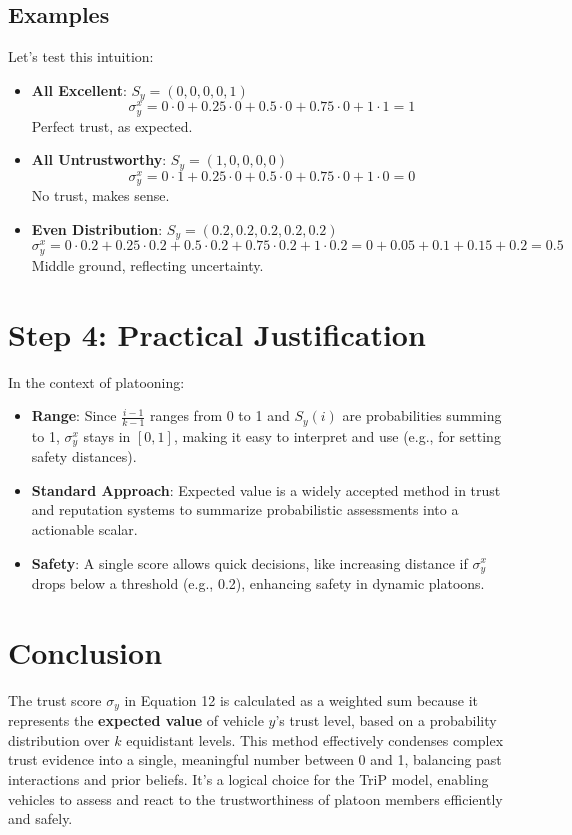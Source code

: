 \documentclass{article}
\begin{document}
\subsection*{Examples}
Let’s test this intuition:
\begin{itemize}
    \item \textbf{All Excellent}: \(S_y = (0, 0, 0, 0, 1)\)
    \[
    \sigma_y^x = 0 \cdot 0 + 0.25 \cdot 0 + 0.5 \cdot 0 + 0.75 \cdot 0 + 1 \cdot 1 = 1
    \]
    Perfect trust, as expected.

    \item \textbf{All Untrustworthy}: \(S_y = (1, 0, 0, 0, 0)\)
    \[
    \sigma_y^x = 0 \cdot 1 + 0.25 \cdot 0 + 0.5 \cdot 0 + 0.75 \cdot 0 + 1 \cdot 0 = 0
    \]
    No trust, makes sense.

    \item \textbf{Even Distribution}: \(S_y = (0.2, 0.2, 0.2, 0.2, 0.2)\)
    \[
    \sigma_y^x = 0 \cdot 0.2 + 0.25 \cdot 0.2 + 0.5 \cdot 0.2 + 0.75 \cdot 0.2 + 1 \cdot 0.2 = 0 + 0.05 + 0.1 + 0.15 + 0.2 = 0.5
    \]
    Middle ground, reflecting uncertainty.
\end{itemize}

\section*{Step 4: Practical Justification}
In the context of platooning:
\begin{itemize}
    \item \textbf{Range}: Since \(\frac{i-1}{k-1}\) ranges from 0 to 1 and \(S_y(i)\) are probabilities summing to 1, \(\sigma_y^x\) stays in \([0, 1]\), making it easy to interpret and use (e.g., for setting safety distances).
    \item \textbf{Standard Approach}: Expected value is a widely accepted method in trust and reputation systems to summarize probabilistic assessments into a actionable scalar.
    \item \textbf{Safety}: A single score allows quick decisions, like increasing distance if \(\sigma_y^x\) drops below a threshold (e.g., 0.2), enhancing safety in dynamic platoons.
\end{itemize}

\section*{Conclusion}
The trust score \(\sigma_y\) in Equation 12 is calculated as a weighted sum because it represents the \textbf{expected value} of vehicle \(y\)’s trust level, based on a probability distribution over \(k\) equidistant levels. This method effectively condenses complex trust evidence into a single, meaningful number between 0 and 1, balancing past interactions and prior beliefs. It’s a logical choice for the TriP model, enabling vehicles to assess and react to the trustworthiness of platoon members efficiently and safely.
\end{document}
